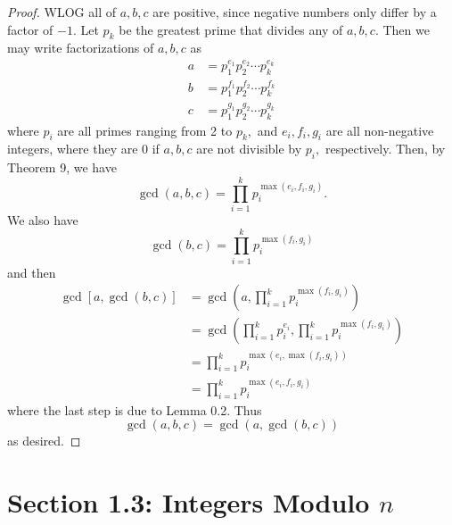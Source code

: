 \documentclass{article}
\begin{document}
\begin{itemize}
		\begin{proof}
			WLOG all of $a, b, c$ are positive, since negative numbers only differ by a factor of $-1.$ Let $p_k$ be the greatest prime that divides any of $a, b, c.$ Then we may write factorizations of $a, b, c$ as 
			\begin{align*}
				a &= p_1^{e_1}p_2^{e_2}\cdots p_k^{e_k} \\
				b &= p_1^{f_1}p_2^{f_2}\cdots p_k^{f_k} \\
				c &= p_1^{g_1}p_2^{g_2}\cdots p_k^{g_k}
			\end{align*} where $p_i$ are all primes ranging from 2 to $p_k,$ and $e_i, f_i, g_i$ are all non-negative integers, where they are 0 if $a, b, c$ are not divisible by $p_i,$ respectively. Then, by Theorem 9, we have \[\gcd{(a, b, c)} = \prod_{i=1}^k p_i^{\max{(e_i, f_i, g_i)}}.\] We also have \[\gcd{(b, c)}=\prod_{i=1}^k p_i^{\max{(f_i, g_i)}}\] and then 
			\begin{align*}
				\gcd{[a, \gcd{(b, c)}]} &= \gcd\left( a, \prod_{i=1}^k p_i^{\max{(f_i, g_i)}} \right) \\
				&= \gcd\left( \prod_{i=1}^k p_i^{e_i}, \prod_{i=1}^k p_i^{\max{(f_i, g_i)}} \right) \\
				&= \prod_{i=1}^k p_i^{\max{(e_i, \max{(f_i, g_i)})}} \\
				&= \prod_{i=1}^k p_i^{\max{(e_i, f_i, g_i)}}
			\end{align*} where the last step is due to Lemma 0.2. Thus \[\gcd{(a, b,  c)} = \gcd{(a, \gcd{(b, c)})}\] as desired.

		\end{proof}
		
\end{itemize}


\section*{Section 1.3: Integers Modulo $n$}
\end{document}
